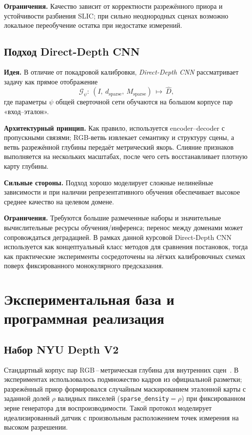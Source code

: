 \documentclass[12pt]{article}
\begin{document}
\textbf{Ограничения.} Качество зависит от корректности разрежённого приора и устойчивости разбиения SLIC; при сильно неоднородных сценах возможно локальное переобучение остатка при недостатке измерений.

\subsection{Подход Direct-Depth CNN}

\textbf{Идея.} В отличие от покадровой калибровки, \textit{Direct-Depth CNN} рассматривает задачу как прямое отображение
\[
  \mathcal{G}_\psi:\ (I,\ d_{\mathrm{sparse}},\ M_{\mathrm{sparse}})\ \mapsto\ \hat D,
\]
где параметры $\psi$ общей сверточной сети обучаются на большом корпусе пар «вход--эталон».

\textbf{Архитектурный принцип.} Как правило, используется encoder--decoder с пропускными связями; RGB-ветвь извлекает семантику и структуру сцены, а ветвь разрежённой глубины передаёт метрический якорь. Слияние признаков выполняется на нескольких масштабах, после чего сеть восстанавливает плотную карту глубины.

\textbf{Сильные стороны.} Подход хорошо моделирует сложные нелинейные зависимости и при наличии репрезентативного обучения обеспечивает высокое среднее качество на целевом домене.

\textbf{Ограничения.} Требуются большие размеченные наборы и значительные вычислительные ресурсы обучения/инференса; перенос между доменами может сопровождаться деградацией. В рамках данной курсовой Direct-Depth CNN используется как концептуальный класс методов для сравнения постановок, тогда как практические эксперименты сосредоточены на лёгких калибровочных схемах поверх фиксированного монокулярного предсказания.

\section{Экспериментальная база и программная реализация}

\subsection{Набор NYU Depth V2}

Стандартный корпус пар RGB\,--\,метрическая глубина для внутренних сцен~\cite{eigen2014depth}. В экспериментах использовалось подмножество кадров из официальной разметки; разрежённый приор формировался случайным маскированием эталонной карты с заданной долей $\rho$ валидных пикселей (\texttt{sparse\_density}${}=\rho$) при фиксированном зерне генератора для воспроизводимости. Такой протокол моделирует идеализированный датчик с произвольным расположением точек измерения на высоком разрешении.
\end{document}
